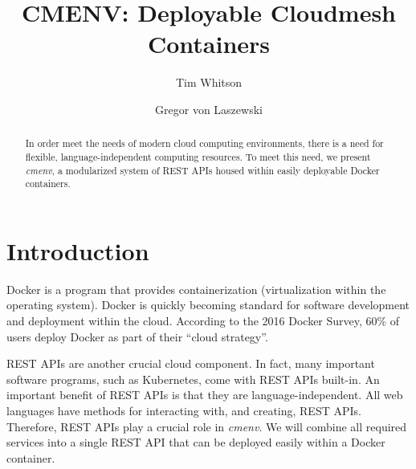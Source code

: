 
\title{CMENV: Deployable Cloudmesh Containers}

\author{Tim Whitson}

\author{Gregor von Laszewski}

\renewcommand{\shortauthors}{T. Whitson}

\def \projectname {\textit{cmenv}}

\begin{abstract}
In order meet the needs of modern cloud computing environments, there is a
need for flexible, language-independent computing resources. To meet this
need, we present \projectname, a modularized system of REST APIs housed
within easily deployable Docker containers.
\end{abstract}


\maketitle

\section{Introduction}

Docker is a program that provides containerization (virtualization
within the operating system). Docker is quickly becoming standard for
software development and deployment within the cloud. According to the
2016 Docker Survey, 60\% of users deploy Docker as part of their ``cloud
strategy''\cite{hid-sp18-526-docker-survey}.

REST APIs are another crucial cloud component. In fact, many important software
programs, such as Kubernetes, come with REST APIs built-in. An important
benefit of REST APIs is that they are language-independent. All web languages
have methods for interacting with, and creating, REST APIs. Therefore, REST
APIs play a crucial role in \projectname. We will combine all required services
into a single REST API that can be deployed easily within a Docker container.

